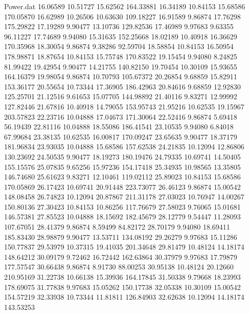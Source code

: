 \begin{filecontents}{Power.dat}
  16.06589   10.51727   15.62562  164.33881
  16.34189   10.84153   15.68586  170.05870
  16.62989   10.26506   10.63630  109.18227
  16.91589    9.86874   17.76298  175.29822
  17.19289    9.90477   13.10736  129.82536
  17.46989    9.97683    9.63355   96.11227
  17.74689    9.94080   15.31635  152.25668
  18.02189   10.40918   16.36629  170.35968
  18.30054    9.86874    9.38286   92.59704
  18.58854   10.84153   16.50954  178.98871
  18.87654   10.84153   15.75748  170.83522
  19.15454    9.94080    8.24825   81.99422
  19.42954    9.90477   14.21755  140.82150
  19.70454   10.30109   15.93655  164.16379
  19.98054    9.86874   10.70793  105.67372
  20.26854    9.68859   15.82911  153.36177
  20.55654   10.73344   17.36905  186.42963
  20.84616    9.68859   12.92830  125.25701
  21.12516    9.61653   15.07705  144.98892
  21.40116    9.83271   12.99992  127.82446
  21.67816   10.40918   14.79055  153.95743
  21.95216   10.62535   19.15967  203.57823
  22.23716   10.04888   17.04673  171.30064
  22.52416    9.86874    5.69418   56.19439
  22.81116   10.04888   18.55086  186.41541
  23.10535    9.94080    6.84018   67.99684
  23.38135   10.62535   16.00817  170.09247
  23.65635    9.90477   18.37179  181.96834
  23.93035   10.04888   15.68586  157.62538
  24.21835   10.12094   12.86806  130.23692
  24.50535    9.90477   18.19273  180.19476
  24.79335   10.69741   14.50405  155.15576
  25.07835    9.65256   15.97236  154.17418
  25.34935   10.98565   13.35805  146.74680
  25.61623    9.83271   12.10461  119.02112
  25.89023   10.84153   15.68586  170.05869
  26.17423   10.69741   20.91448  223.73077
  26.46123    9.86874   15.00542  148.08458
  26.74823   10.12094   20.87867  211.31178
  27.03023   10.76947   14.00267  150.80136
  27.30423   10.84153   10.86256  117.76679
  27.58023    9.76065   15.01681  146.57381
  27.85523   10.04888   18.15692  182.45679
  28.12779    9.54447   11.28093  107.67051
  28.41379    9.86874    8.59499   84.82172
  28.70179    9.94080   18.69411  185.83430
  28.98879    9.90477   13.53711  134.08192
  29.26279    9.97683   15.11286  150.77837
  29.53979   10.37315   19.41035  201.34648
  29.81479   10.48124   14.18174  148.64212
  30.09179    9.72462   16.72442  162.63864
  30.37979    9.97683   17.79879  177.57547
  30.66438    9.86874    8.91730   88.00253
  30.95138   10.48124   20.12660  210.95169
  31.22738   10.66138   15.39936  164.17845
  31.50338    9.79668   18.23993  178.69075
  31.77838    9.97683   15.05262  150.17738
  32.05338   10.30109   15.00542  154.57219
  32.33938   10.73344   11.81811  126.84903
  32.62638   10.12094   14.18174  143.53253

\end{filecontents}
